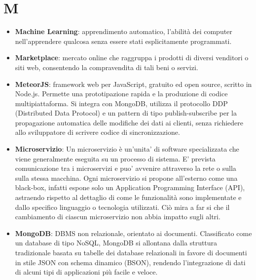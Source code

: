 \section{M}
\begin{itemize} 
	\item \textbf{Machine Learning}: apprendimento automatico, l'abilità dei computer nell'apprendere qualcosa senza essere stati esplicitamente programmati.
	\item \textbf{Marketplace}: mercato online che raggruppa i prodotti di diversi venditori o siti web, consentendo la compravendita di tali beni o servizi.
	\item \textbf{MeteorJS}: framework web per JavaScript, gratuito ed open source, scritto in Node.js. Permette una prototipazione rapida e la produzione di codice multipiattaforma. Si integra con MongoDB, utilizza il protocollo DDP (Distributed Data Protocol) e un pattern di tipo publish-subscribe per la propagazione automatica delle modifiche dei dati ai clienti, senza richiedere allo sviluppatore di scrivere codice di sincronizzazione.
	\item \textbf{Microservizio}: Un microservizio è un’unita' di software specializzata che viene generalmente eseguita su un processo di sistema. E' prevista comunicazione tra i microservizi e puo' avvenire attraverso la rete o sulla sulla stessa macchina. Ogni microservizio si propone all’esterno come una black-box, infatti espone solo un Application Programming Interface (API), astraendo rispetto al dettaglio di come le funzionalità sono implementate e dallo specifico linguaggio o tecnologia utilizzati. Ciò mira a far si che il cambiamento di ciascun microservizio non abbia impatto sugli altri.
	\item \textbf{MongoDB}: DBMS non relazionale, orientato ai documenti. Classificato come un database di tipo NoSQL, MongoDB si allontana dalla struttura tradizionale basata su tabelle dei database relazionali in favore di documenti in stile JSON con schema dinamico (BSON), rendendo l'integrazione di dati di alcuni tipi di applicazioni più facile e veloce. 
\end{itemize}
